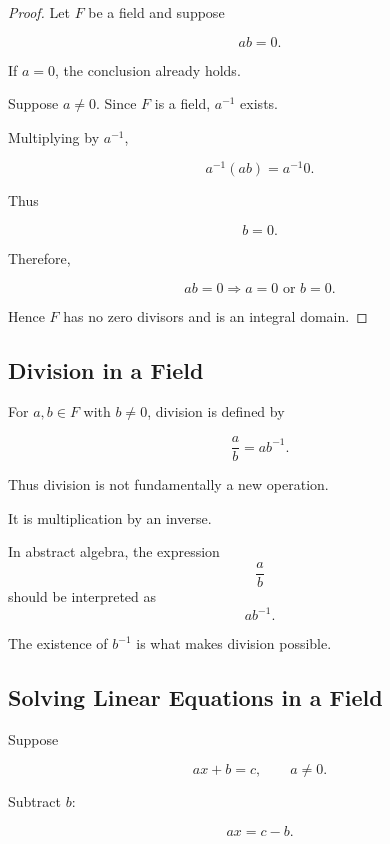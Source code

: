 \begin{proof}
Let \(F\) be a field and suppose

\[ ab=0. \]

If \(a=0\), the conclusion already holds.

Suppose \(a\neq0\). Since \(F\) is a field, \(a^{-1}\) exists.

Multiplying by \(a^{-1}\),

\[ a^{-1}(ab)=a^{-1}0. \]

Thus

\[ b=0. \]

Therefore,

\[ ab=0\Longrightarrow a=0\text{ or }b=0. \]

Hence \(F\) has no zero divisors and is an integral domain.
\end{proof}

\subsection{Division in a Field}
\label{subsec:division-field}

For \(a,b\in F\) with \(b\neq0\), division is defined by

\[ \frac{a}{b}=ab^{-1}. \]

Thus division is not fundamentally a new operation.

It is multiplication by an inverse.

\begin{importantbox}
In abstract algebra, the expression
\[ \frac{a}{b} \]
should be interpreted as
\[ ab^{-1}. \]

The existence of \(b^{-1}\) is what makes division possible.
\end{importantbox}

\subsection{Solving Linear Equations in a Field}
\label{subsec:linear-equations-field}

Suppose

\[ ax+b=c,\qquad a\neq0. \]

Subtract \(b\):

\[ ax=c-b. \]

